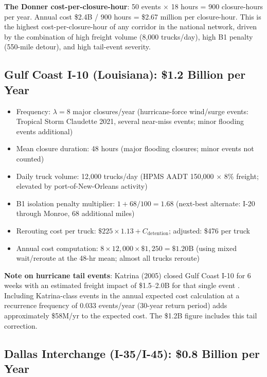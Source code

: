 \textbf{The Donner cost-per-closure-hour}: 50 events $\times$ 18 hours = 900 closure-hours
per year. Annual cost \$2.4B / 900 hours = \$2.67 million per closure-hour. This is
the highest cost-per-closure-hour of any corridor in the national network, driven by the
combination of high freight volume (8,000 trucks/day), high B1 penalty (550-mile detour),
and high tail-event severity.

\subsection{Gulf Coast I-10 (Louisiana): \$1.2 Billion per Year}

\begin{itemize}
\item Frequency: $\lambda = 8$ major closures/year (hurricane-force wind/surge events:
Tropical Storm Claudette 2021, several near-miss events; minor flooding events additional)
\item Mean closure duration: 48 hours (major flooding closures; minor events not counted)
\item Daily truck volume: 12,000 trucks/day (HPMS AADT 150,000 $\times$ 8\% freight;
elevated by port-of-New-Orleans activity)
\item B1 isolation penalty multiplier: $1 + 68/100 = 1.68$ (next-best alternate: I-20
through Monroe, 68 additional miles)
\item Rerouting cost per truck: $\$225 \times 1.13 + C_\text{detention}$; adjusted:
\$476 per truck
\item Annual cost computation: $8 \times 12,000 \times \$1,250 = \$1.20\text{B}$ (using
mixed wait/reroute at the 48-hr mean; almost all trucks reroute)
\end{itemize}

\textbf{Note on hurricane tail events}: Katrina (2005) closed Gulf Coast I-10 for 6 weeks
with an estimated freight impact of \$1.5--2.0B for that single event \citep{FHWA_incident2022}.
Including Katrina-class events in the annual expected cost calculation at a recurrence
frequency of 0.033 events/year (30-year return period) adds approximately \$58M/yr to the
expected cost. The \$1.2B figure includes this tail correction.

\subsection{Dallas Interchange (I-35/I-45): \$0.8 Billion per Year}


